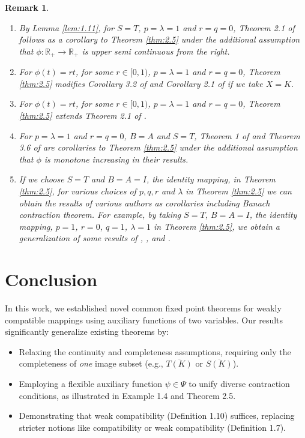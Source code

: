 \documentclass[11]{article}
\newtheorem{remark}[definition]{Remark}
\numberwithin{equation}{section}
\begin{document}
\begin{remark}\label{rem:2.6}
\begin{enumerate}
\item[(i)] By Lemma \ref{lem:1.11}, for $S = T$, $p = \lambda = 1$ and $r = q = 0$, Theorem 2.1 of \cite{Zhang2008} follows as a corollary to Theorem \ref{thm:2.5} under the additional assumption that $\phi : \mathbb{R}_{+} \to \mathbb{R}_{+}$ is upper semi continuous from the right.

\item[(ii)] For $\phi(t) = rt$, for some $r \in [0, 1)$, $p = \lambda = 1$ and $r = q = 0$, Theorem \ref{thm:2.5} modifies Corollary 3.2 of \cite{Jungck1986} and Corollary 2.1 of \cite{Jungck1994} if we take $X = K$.

\item[(iii)] For $\phi(t) = rt$, for some $r \in [0, 1)$, $p = \lambda = 1$ and $r = q = 0$, Theorem \ref{thm:2.5} extends Theorem 2.1 of \cite{AlThagafi2006}.

\item[(iv)] For $p = \lambda = 1$ and $r = q = 0$, $B = A$ and $S = T$, Theorem 1 of \cite{Pant1994} and Theorem 3.6 of \cite{Murthy1998} are corollaries to Theorem \ref{thm:2.5} under the additional assumption that $\phi$ is monotone increasing in their results.

\item[(v)] If we choose $S = T$ and $B = A = I$, the identity mapping, in Theorem \ref{thm:2.5}, for various choices of $p, q, r$ and $\lambda$ in Theorem \ref{thm:2.5} we can obtain the results of various authors as corollaries including Banach contraction theorem. For example, by taking $S = T$, $B = A = I$, the identity mapping, $p = 1$, $r = 0$, $q = 1$, $\lambda = 1$ in Theorem \ref{thm:2.5}, we obtain a generalization of some results of \cite{Bianchini1972}, \cite{Kannan1968}, \cite{Reich1971} and \cite{Rhoades1977}.
\end{enumerate}
\end{remark}

\section{Conclusion}
In this work, we established novel common fixed point theorems for weakly compatible mappings using auxiliary functions of two variables. Our results significantly generalize existing theorems by:  

\begin{itemize}  
\item Relaxing the continuity and completeness assumptions, requiring only the completeness of \emph{one} image subset (e.g., $\overline{T(K)}$ or $\overline{S(K)}$).  
\item Employing a flexible auxiliary function $\psi \in \Psi$ to unify diverse contraction conditions, as illustrated in Example 1.4 and Theorem 2.5.  
\item Demonstrating that weak compatibility (Definition 1.10) suffices, replacing stricter notions like compatibility or weak compatibility (Definition 1.7).  
\end{itemize}  
\end{document}
